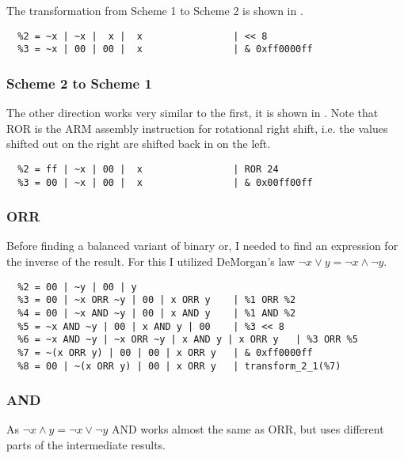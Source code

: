 The transformation from Scheme 1 to Scheme 2 is shown in .

\begin{lstlisting}[caption={Transforming from Scheme 1 to Scheme 2}, label=lst:s12]
  %1 = 00 | ~x | 00 |  x
  %2 = ~x | ~x |  x |  x                | << 8
  %3 = ~x | 00 | 00 |  x                | & 0xff0000ff
\end{lstlisting}

\subsubsection{Scheme 2 to Scheme 1}
The other direction works very similar to the first, it is shown in .
Note that ROR is the ARM assembly instruction for rotational right shift, i.e. the values shifted out on the right are shifted back in on the left.

\begin{lstlisting}[caption=Transforming from Scheme 2 to Scheme 1, label=lst:s21]
  %1 = ~x | 00 | 00 |  x
  %2 = ff | ~x | 00 |  x                | ROR 24
  %3 = 00 | ~x | 00 |  x                | & 0x00ff00ff
\end{lstlisting}

\subsubsection{ORR}
Before finding a balanced variant of binary or, I needed to find an expression for the inverse of the result.
For this I utilized DeMorgan's law $\neg{x \lor y} = \neg{x} \land \neg{y}$.

\begin{lstlisting}[caption=Balanced ORR, label=lst:orr]
  %1 = 00 | ~x | 00 | x
  %2 = 00 | ~y | 00 | y
  %3 = 00 | ~x ORR ~y | 00 | x ORR y    | %1 ORR %2
  %4 = 00 | ~x AND ~y | 00 | x AND y    | %1 AND %2
  %5 = ~x AND ~y | 00 | x AND y | 00    | %3 << 8
  %6 = ~x AND ~y | ~x ORR ~y | x AND y | x ORR y   | %3 ORR %5
  %7 = ~(x ORR y) | 00 | 00 | x ORR y   | & 0xff0000ff
  %8 = 00 | ~(x ORR y) | 00 | x ORR y   | transform_2_1(%7)
\end{lstlisting}

\subsubsection{AND}
As $\neg{x \land y} = \neg{x} \lor \neg{y}$ AND works almost the same as ORR, but uses different parts of the intermediate results.

